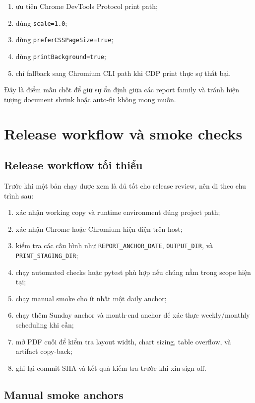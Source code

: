 \begin{enumerate}[label=-]
\item ưu tiên Chrome DevTools Protocol print path;
\item dùng \texttt{scale=1.0};
\item dùng \texttt{preferCSSPageSize=true};
\item dùng \texttt{printBackground=true};
\item chỉ fallback sang Chromium CLI path khi CDP print thực sự thất bại.
\end{enumerate}

Đây là điểm mấu chốt để giữ sự ổn định giữa các report family và tránh hiện tượng document shrink hoặc auto-fit không mong muốn.

\section{Release workflow và smoke checks}

\subsection{Release workflow tối thiểu}

Trước khi một bản chạy được xem là đủ tốt cho release review, nên đi theo chu trình sau:

\begin{enumerate}[label=-]
\item xác nhận working copy và runtime environment đúng project path;
\item xác nhận Chrome hoặc Chromium hiện diện trên host;
\item kiểm tra các cấu hình như \texttt{REPORT\_ANCHOR\_DATE}, \texttt{OUTPUT\_DIR}, và \texttt{PRINT\_STAGING\_DIR};
\item chạy automated checks hoặc pytest phù hợp nếu chúng nằm trong scope hiện tại;
\item chạy manual smoke cho ít nhất một daily anchor;
\item chạy thêm Sunday anchor và month-end anchor để xác thực weekly/monthly scheduling khi cần;
\item mở PDF cuối để kiểm tra layout width, chart sizing, table overflow, và artifact copy-back;
\item ghi lại commit SHA và kết quả kiểm tra trước khi xin sign-off.
\end{enumerate}

\subsection{Manual smoke anchors}


